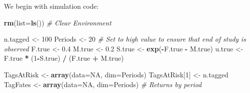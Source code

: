 \documentclass[
]{krantz}
\makeatletter
\newenvironment{Shaded}{\begin{snugshade}}{\end{snugshade}}
\newcommand{\AttributeTok}[1]{\textcolor[rgb]{0.27,0.27,0.27}{#1}}
\newcommand{\CommentTok}[1]{\textcolor[rgb]{0.37,0.37,0.37}{\textit{#1}}}
\newcommand{\ConstantTok}[1]{\textcolor[rgb]{0.37,0.37,0.37}{#1}}
\newcommand{\DecValTok}[1]{\textcolor[rgb]{0.06,0.06,0.06}{#1}}
\newcommand{\FloatTok}[1]{\textcolor[rgb]{0.06,0.06,0.06}{#1}}
\newcommand{\FunctionTok}[1]{\textcolor[rgb]{0.27,0.27,0.27}{\textbf{#1}}}
\newcommand{\NormalTok}[1]{#1}
\newcommand{\OtherTok}[1]{\textcolor[rgb]{0.37,0.37,0.37}{#1}}
\newcommand{\SpecialCharTok}[1]{\textcolor[rgb]{0.43,0.43,0.43}{\textbf{#1}}}
\newenvironment{kframe}{%
\medskip{}
\setlength{\fboxsep}{.8em}
 \def\at@end@of@kframe{}%
 \ifinner\ifhmode%
  \def\at@end@of@kframe{\end{minipage}}%
  \begin{minipage}{\columnwidth}%
 \fi\fi%
 \def\FrameCommand##1{\hskip\@totalleftmargin \hskip-\fboxsep
 \colorbox{shadecolor}{##1}\hskip-\fboxsep
     \hskip-\linewidth \hskip-\@totalleftmargin \hskip\columnwidth}%
 \MakeFramed {\advance\hsize-\width
   \@totalleftmargin\z@ \linewidth\hsize
   \@setminipage}}%
 {\par\unskip\endMakeFramed%
 \at@end@of@kframe}
\renewenvironment{Shaded}{\begin{kframe}}{\end{kframe}}
\makeatother
\begin{document}
We begin with simulation code:

\begin{Shaded}
\begin{Highlighting}[]
\FunctionTok{rm}\NormalTok{(}\AttributeTok{list=}\FunctionTok{ls}\NormalTok{()) }\CommentTok{\# Clear Environment}

\NormalTok{n.tagged }\OtherTok{\textless{}{-}} \DecValTok{100}
\NormalTok{Periods }\OtherTok{\textless{}{-}} \DecValTok{20} \CommentTok{\# Set to high value to ensure that end of study is observed}
\NormalTok{F.true }\OtherTok{\textless{}{-}} \FloatTok{0.4}
\NormalTok{M.true }\OtherTok{\textless{}{-}} \FloatTok{0.2}
\NormalTok{S.true }\OtherTok{\textless{}{-}} \FunctionTok{exp}\NormalTok{(}\SpecialCharTok{{-}}\NormalTok{F.true }\SpecialCharTok{{-}}\NormalTok{ M.true)}
\NormalTok{u.true }\OtherTok{\textless{}{-}}\NormalTok{ F.true }\SpecialCharTok{*}\NormalTok{ (}\DecValTok{1}\SpecialCharTok{{-}}\NormalTok{S.true) }\SpecialCharTok{/}\NormalTok{ (F.true }\SpecialCharTok{+}\NormalTok{ M.true)}

\NormalTok{TagsAtRisk }\OtherTok{\textless{}{-}} \FunctionTok{array}\NormalTok{(}\AttributeTok{data=}\ConstantTok{NA}\NormalTok{, }\AttributeTok{dim=}\NormalTok{Periods)}
\NormalTok{TagsAtRisk[}\DecValTok{1}\NormalTok{] }\OtherTok{\textless{}{-}}\NormalTok{ n.tagged}
\NormalTok{TagFates }\OtherTok{\textless{}{-}} \FunctionTok{array}\NormalTok{(}\AttributeTok{data=}\ConstantTok{NA}\NormalTok{, }\AttributeTok{dim=}\NormalTok{Periods) }\CommentTok{\# Returns by period}


\end{Highlighting}
\end{Shaded}
\end{document}
